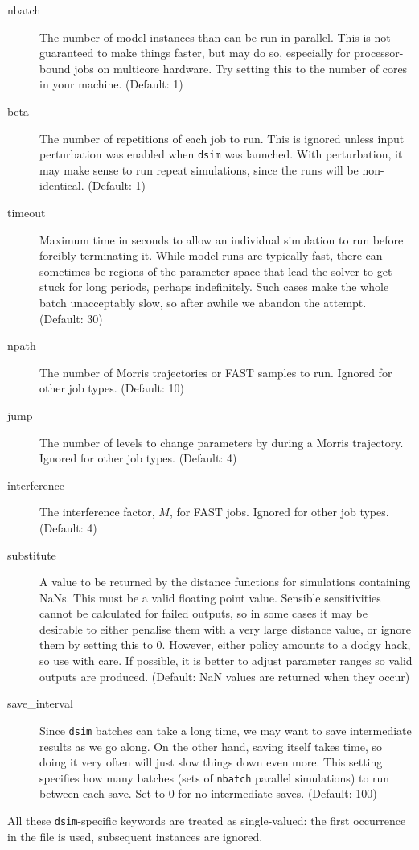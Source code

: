 \documentclass[a4paper,11pt]{article}
\begin{document}
\begin{adjustwidth}{0.8cm}{0.8cm}
\begin{description}
\item[nbatch] The number of model instances than can be run in parallel. This is not guaranteed to make things faster, but may do so, especially for processor-bound jobs on multicore hardware. Try setting this to the number of cores in your machine. (Default: 1)
\item[beta] The number of repetitions of each job to run. This is ignored unless input perturbation was enabled when \texttt{dsim} was launched. With perturbation, it may make sense to run repeat simulations, since the runs will be non-identical. (Default: 1)
\item[timeout] Maximum time in seconds to allow an individual simulation to run before forcibly terminating it. While model runs are typically fast, there can sometimes be regions of the parameter space that lead the solver to get stuck for long periods, perhaps indefinitely. Such cases make the whole batch unacceptably slow, so after awhile we abandon the attempt. (Default: 30)
\item[npath] The number of Morris trajectories or FAST samples to run. Ignored for other job types. (Default: 10)
\item[jump] The number of levels to change parameters by during a Morris trajectory. Ignored for other job types. (Default: 4)
\item[interference] The interference factor, $M$, for FAST jobs. Ignored for other job types. (Default: 4)
\item[substitute] A value to be returned by the distance functions for simulations containing NaNs. This must be a valid floating point value. Sensible sensitivities cannot be calculated for failed outputs, so in some cases it may be desirable to either penalise them with a very large distance value, or ignore them by setting this to 0. However, either policy amounts to a dodgy hack, so use with care. If possible, it is better to adjust parameter ranges so valid outputs are produced. (Default: NaN values are returned when they occur)
\item[save\_interval] Since \texttt{dsim} batches can take a long time, we may want to save intermediate results as we go along. On the other hand, saving itself takes time, so doing it very often will just slow things down even more. This setting specifies how many batches (sets of \texttt{nbatch} parallel simulations) to run between each save. Set to 0 for no intermediate saves. (Default: 100)
\end{description}
\end{adjustwidth}
All these \texttt{dsim}-specific keywords are treated as single-valued: the first occurrence in the file is used, subsequent instances are ignored.
\end{document}
